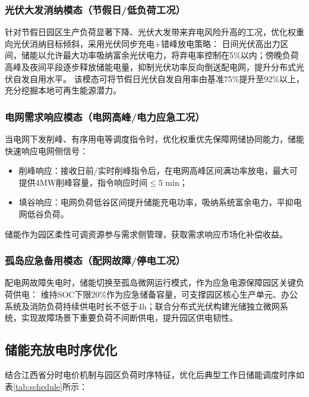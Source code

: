 \documentclass[12pt,a4paper]{article}
\begin{document}
\subsubsection{光伏大发消纳模态（节假日/低负荷工况）}
针对节假日园区生产负荷显著下降、光伏大发带来弃电风险升高的工况，优化权重向光伏消纳目标倾斜，采用光伏同步充电+错峰放电策略：
日间光伏高出力区间，储能以允许最大功率吸纳富余光伏电力，将弃电率控制在5\%以内；傍晚负荷高峰及夜间平段逐步释放储能电量，抑制光伏功率反向倒送配电网，提升分布式光伏自发自用水平。
该模态可将节假日光伏自发自用率由基准75\%提升至92\%以上，充分挖掘本地可再生能源潜力。

\subsubsection{电网需求响应模态（电网高峰/电力应急工况）}
当电网下发削峰、有序用电等调度指令时，优化权重优先保障网储协同能力，储能快速响应电网侧信号：
\begin{itemize}
    \item 削峰响应：接收日前/实时削峰指令后，在电网高峰区间满功率放电，最大可提供4MW削峰容量，指令响应时间$\le 5$ min；
    \item 填谷响应：电网负荷低谷区间提升储能充电功率，吸纳系统富余电力，平抑电网低谷负荷。
\end{itemize}
储能作为园区柔性可调资源参与需求侧管理，获取需求响应市场化补偿收益。

\subsubsection{孤岛应急备用模态（配网故障/停电工况）}
配电网故障失电时，储能切换至孤岛微网运行模式，作为应急电源保障园区关键负荷供电：
维持SOC下限20\%作为应急储备容量，可支撑园区核心生产单元、办公系统及消防负荷持续供电时长不低于4h；联合分布式光伏构建光储独立微网系统，实现故障场景下重要负荷不间断供电，提升园区供电韧性。

\subsection{储能充放电时序优化}
结合江西省分时电价机制与园区负荷时序特征，优化后典型工作日储能调度时序如表\ref{tab:schedule}所示：
\end{document}
